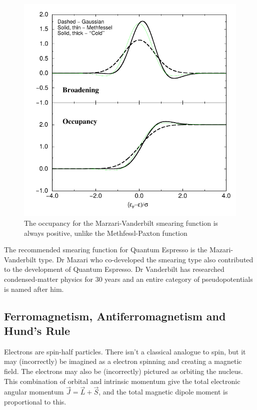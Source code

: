 \begin{figure}
\centering
\begin{minipage}{.65\textwidth}
\centering
    \includegraphics[width=.75\linewidth]{chapters/interatomic_potential_fitting/images/marzarismearing.png}
    \caption{The occupancy for the Marzari-Vanderbilt smearing function is always positive, unlike the Methfessl-Paxton function\cite{marzarithesis2}}
    \label{fig:marzarimethfessel}
\end{minipage}
\end{figure}

The recommended smearing function for Quantum Espresso is the Mazari-Vanderbilt type.  Dr Mazari
who co-developed the smearing type also contributed to the development of Quantum Espresso.  Dr Vanderbilt has researched condensed-matter physics for 30 years and an entire category of pseudopotentials is named after him.



\FloatBarrier
\subsection{Ferromagnetism, Antiferromagnetism and Hund's Rule}
\label{section:hundsrule}

Electrons are spin-half particles.  There isn't a classical analogue to spin, but it may (incorrectly) be imagined as a electron spinning and creating a magnetic field.  The electrons may also be (incorrectly) pictured as orbiting the nucleus.  This combination of orbital and intrinsic momentum give the total electronic angular momentum $\vec{J} = \vec{L} + \vec{S}$, and the total magnetic dipole moment is proportional to this.

